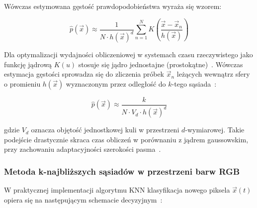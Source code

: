 Wówczas estymowana gęstość prawdopodobieństwa wyraża się wzorem:

\begin{equation}
  \hat{p}(\vec{x}) \approx \frac{1}{N \cdot h(\vec{x})^d}
  \sum_{n=1}^{N} K\!\left(\frac{\vec{x} - \vec{x}_n}{h(\vec{x})}\right)
\end{equation}

Dla optymalizacji wydajności obliczeniowej w systemach czasu rzeczywistego jako funkcję jądrową
$K(u)$ stosuje się jądro jednostajne (prostokątne)~\cite{terrell1992}. Wówczas estymacja gęstości
sprowadza się do zliczenia próbek $\vec{x}_n$ leżących wewnątrz sfery o promieniu $h(\vec{x})$
wyznaczonym przez odległość do $k$-tego sąsiada~\cite{zivkovic2006}:

\begin{equation}
  \hat{p}(\vec{x}) \approx \frac{k}{N \cdot V_d \cdot h(\vec{x})^d}
\end{equation}

gdzie $V_d$ oznacza objętość jednostkowej kuli w przestrzeni $d$-wymiarowej. Takie podejście
drastycznie skraca czas obliczeń w porównaniu z jądrem gaussowskim, przy zachowaniu adaptacyjności
szerokości pasma~\cite{zivkovic2006, mittal2004}.

\subsubsection{Metoda k-najbliższych sąsiadów w przestrzeni barw RGB}

W praktycznej implementacji algorytmu KNN klasyfikacja nowego piksela $\vec{x}(t)$ opiera się na
następującym schemacie decyzyjnym~\cite{zivkovic2006}:

